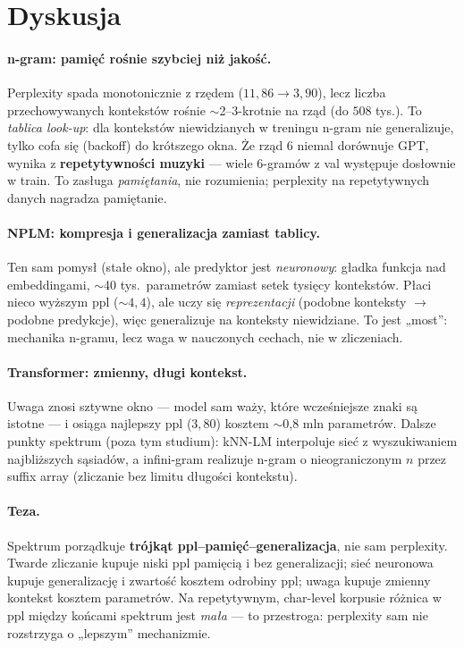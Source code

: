 \documentclass[11pt]{article}
\begin{document}
\section{Dyskusja}
\paragraph{n-gram: pamięć rośnie szybciej niż jakość.} Perplexity spada monotonicznie z rzędem
($11{,}86\!\to\!3{,}90$), lecz liczba przechowywanych kontekstów rośnie $\sim$2--3-krotnie na rząd (do $508$
tys.). To \emph{tablica look-up}: dla kontekstów niewidzianych w treningu n-gram nie generalizuje, tylko cofa
się (backoff) do krótszego okna. Że rząd 6 niemal dorównuje GPT, wynika z \textbf{repetytywności muzyki} ---
wiele 6-gramów z val występuje dosłownie w train. To zasługa \emph{pamiętania}, nie rozumienia; perplexity na
repetytywnych danych nagradza pamiętanie.

\paragraph{NPLM: kompresja i generalizacja zamiast tablicy.} Ten sam pomysł (stałe okno), ale predyktor jest
\emph{neuronowy}: gładka funkcja nad embeddingami, $\sim$40 tys.\ parametrów zamiast setek tysięcy kontekstów.
Płaci nieco wyższym ppl ($\sim$$4{,}4$), ale uczy się \emph{reprezentacji} (podobne konteksty $\to$ podobne
predykcje), więc generalizuje na konteksty niewidziane. To jest „most'': mechanika n-gramu, lecz waga w
nauczonych cechach, nie w zliczeniach.

\paragraph{Transformer: zmienny, długi kontekst.} Uwaga \cite{transformer} znosi sztywne okno --- model sam waży,
które wcześniejsze znaki są istotne --- i osiąga najlepszy ppl ($3{,}80$) kosztem $\sim$0{,}8 mln parametrów.
Dalsze punkty spektrum (poza tym studium): kNN-LM \cite{knnlm} interpoluje sieć z wyszukiwaniem najbliższych
sąsiadów, a infini-gram \cite{infinigram} realizuje n-gram o nieograniczonym $n$ przez suffix array (zliczanie
bez limitu długości kontekstu).

\paragraph{Teza.} Spektrum porządkuje \textbf{trójkąt ppl--pamięć--generalizacja}, nie sam perplexity. Twarde
zliczanie kupuje niski ppl pamięcią i bez generalizacji; sieć neuronowa kupuje generalizację i zwartość kosztem
odrobiny ppl; uwaga kupuje zmienny kontekst kosztem parametrów. Na repetytywnym, char-level korpusie różnica
w ppl między końcami spektrum jest \emph{mała} --- to przestroga: perplexity sam nie rozstrzyga o „lepszym''
mechanizmie.
\end{document}
